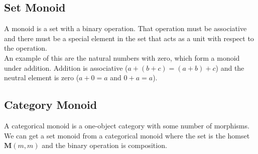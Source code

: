 \documentclass[12pt]{article}
\begin{document}
\subsection{Set Monoid}
A monoid is a set with a binary operation. That operation must be associative and there must be a special element in the set that acts as a unit with respect to the operation.\\
An example of this are the natural numbers with zero, which form a monoid under addition. Addition is associative ($a + (b + c) = (a + b) + c$) and the neutral element is zero ($a + 0 = a$ and $0 + a = a$).

\subsection{Category Monoid}
A categorical monoid is a one-object category with some number of morphisms. \\

We can get a set monoid from a categorical monoid where the set is the homset $\mathbf{M}(m,m)$ and the binary operation is composition.
\end{document}
